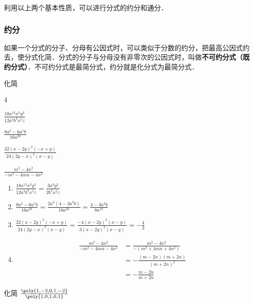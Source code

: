 利用以上两个基本性质，可以进行分式的约分和通分．

\subsubsection{约分}

如果一个分式的分子、分母有公因式时，可以类似于分数的约分，把最高公因式约去，使分式化简．分式的分子与分母没有非零次的公因式时，叫做\textbf{不可约分式（既约分式）}．不可约分式是最简分式，约分就是化分式为最简分式．

\begin{example}
    化简
\begin{enumerate}
    \begin{multicols}{4}
            \item $\frac{18 a^{12} x^{3} y^{2}}{12 a^{3} b^{2} x^{5} z}$
    \item $\frac{8 a^{2}-6 a^{5} b}{16 a^{20}}$
    \item $\frac{32(x-2 y)^{2}(-x+y)}{24(2 y-x)^{2}(x-y)}$
    \item $\frac{m^{2}-4 n^{2}}{-m^{2}-4 m n-4 n^{2}}$
    \end{multicols}
\end{enumerate}
\end{example}

\begin{solution}
\begin{enumerate}
    \item $\frac{18 a^{12} x^{3} y^{2}}{12 a^{3} b^{2} x^{5} z}=\frac{3 a^{9} y^{2}}{2 b^{2} x^{2} z}$
    \item $\frac{8 a^{2}-6 a^{5} b}{16 a^{20}}  =\frac{2 a^{2}\left(4-3 a^{3} b\right)}{16 a^{20}} = \frac{4-3 a^{3} b}{8 a^{18}} $
    \item $ \frac{32(x-2 y)^{2}(-x+y)}{24(2 y-x)^{2}(x-y)}  =\frac{-4(x-2 y)^{2}(x-y)}{3(x-2 y)^{2}(x-y)}=-\frac{4}{3}$
    \item \[\begin{split}
        \frac{m^{2}-4 n^{2}}{-m^{2}-4 m n-4 n^{2}} &=
    \frac{m^{2}-4 n^{2}}{-\left(m^{2}+4 m n+4 n^{2}\right)}\\&=-\frac{(m-2n)(m+2n)}{(m+2n)^2}\\&=-\frac{m-2n}{m+2n}
    \end{split} \]
\end{enumerate}
\end{solution}

\begin{example}
    化简 $\frac{\poly{1,-2,0,1,-2}}{\poly{1,0,1,0,1}}$
\end{example}

